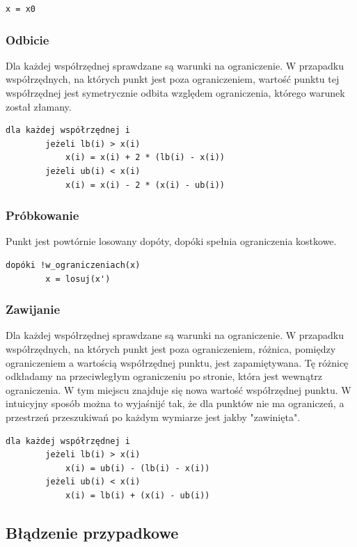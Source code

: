 \documentclass{mini}
\begin{document}
\begin{Verbatim}[baselinestretch=1.1]
	x = x0
\end{Verbatim}


\subsubsection{Odbicie}
Dla każdej współrzędnej sprawdzane są warunki na ograniczenie. W przapadku współrzędnych, na których punkt jest poza ograniczeniem, wartość punktu tej współrzędnej jest symetrycznie odbita względem ograniczenia, którego warunek został złamany.

\begin{Verbatim}[baselinestretch=1.1]
	dla każdej współrzędnej i
		jeżeli lb(i) > x(i)
			x(i) = x(i) + 2 * (lb(i) - x(i))
		jeżeli ub(i) < x(i)
			x(i) = x(i) - 2 * (x(i) - ub(i))
\end{Verbatim}

\subsubsection{Próbkowanie}
Punkt jest powtórnie losowany dopóty, dopóki spełnia ograniczenia kostkowe.

\begin{Verbatim}[baselinestretch=1.1]
	dopóki !w_ograniczeniach(x)
		x = losuj(x')
\end{Verbatim}

\subsubsection{Zawijanie}
Dla każdej współrzędnej sprawdzane są warunki na ograniczenie. W przapadku współrzędnych, na których punkt jest poza ograniczeniem, różnica, pomiędzy ograniczeniem a wartością współrzędnej punktu, jest zapamiętywana. Tę różnicę odkładamy na przeciwległym ograniczeniu po stronie, która jest wewnątrz ograniczenia. W tym miejscu znajduje się nowa wartość współrzędnej punktu. W intuicyjny sposób można to wyjaśnijć tak, że dla punktów nie ma ograniczeń, a przestrzeń przeszukiwań po każdym wymiarze jest jakby "zawinięta".

\begin{Verbatim}[baselinestretch=1.1]
	dla każdej współrzędnej i
		jeżeli lb(i) > x(i)
			x(i) = ub(i) - (lb(i) - x(i))
		jeżeli ub(i) < x(i)
			x(i) = lb(i) + (x(i) - ub(i))
\end{Verbatim}

\subsection{Błądzenie przypadkowe} \label{bladzenie}
\end{document}
